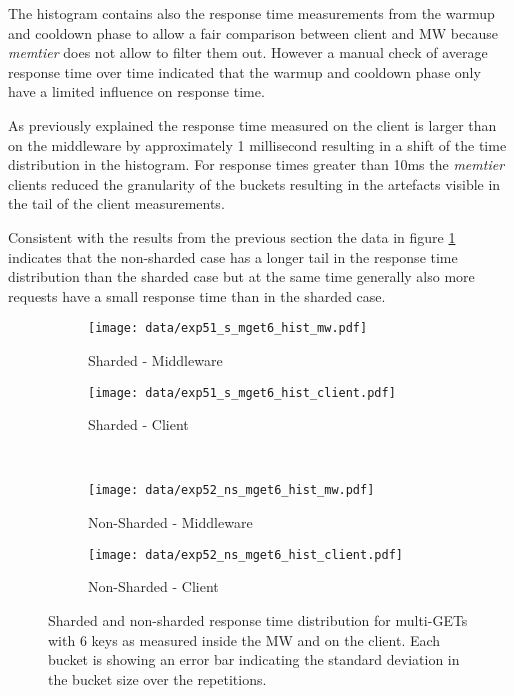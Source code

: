 \documentclass[report.tex]{subfiles}
\begin{document}
The histogram contains also the response time measurements from the warmup and cooldown phase to allow a fair comparison between client and MW because \emph{memtier} does not allow to filter them out. However a manual check of average response time over time indicated that the warmup and cooldown phase only have a limited influence on response time.

As previously explained the response time measured on the client is larger than on the middleware by approximately 1 millisecond resulting in a shift of the time distribution in the histogram.
For response times greater than 10ms the \emph{memtier} clients reduced the granularity of the buckets resulting in the artefacts visible in the tail of the client measurements.

Consistent with the results from the previous section the data in figure \ref{exp5_hist} indicates that the non-sharded case has a longer tail in the response time distribution than the sharded case but at the same time generally also more requests have a small response time than in the sharded case.

\begin{figure}
	\begin{subfigure}[b]{.49\linewidth}
		\centering
		\texttt{[image: data/exp51\_s\_mget6\_hist\_mw.pdf]}
		\caption{Sharded - Middleware}
	\end{subfigure}\hfill
	\begin{subfigure}[b]{.49\linewidth}
		\centering
		\texttt{[image: data/exp51\_s\_mget6\_hist\_client.pdf]}
		\caption{Sharded - Client}
	\end{subfigure} \\
	\begin{subfigure}[b]{.49\linewidth}
		\centering
		\texttt{[image: data/exp52\_ns\_mget6\_hist\_mw.pdf]}
		\caption{Non-Sharded - Middleware}
	\end{subfigure}\hfill
	\begin{subfigure}[b]{.49\linewidth}
		\centering
		\texttt{[image: data/exp52\_ns\_mget6\_hist\_client.pdf]}
		\caption{Non-Sharded - Client}
	\end{subfigure}%
	\caption{Sharded and non-sharded response time distribution for multi-GETs with 6 keys as measured inside the MW and on the client. Each bucket is showing an error bar indicating the standard deviation in the bucket size over the repetitions.}\label{exp5_hist}
\end{figure}
\end{document}
